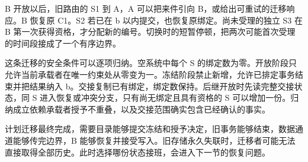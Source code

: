 
B 开放以后，旧路由的 S1 到 A，A 可以把来件引向 B，或给出可重试的迁移响应。B 恢复原 C1。S2 若已在 b 以内提交，也恢复原绑定。尚未受理的独立 S3 在 B 第一次获得资格，才分配新的编号。切换时的短暂停顿，把两次可能首次受理的时间段接成了一个有序边界。

这条迁移的安全条件可以逐项归纳。空系统中每个 S 的绑定数为零。开放阶段只允许当前承载者在唯一约束处从零变为一。冻结阶段禁止新增，允许已排定事务结束并把结果纳入 b。交接复制已有绑定，绑定数保持。后继开放时先读完整交接状态，同 S 进入恢复或冲突分支，只有尚无绑定且具有资格的 S 可以增加一份。归纳成立依赖承载者授予不重叠，以及交接范围确实包含已经确认的事实。

计划迁移最终完成，需要目录能够提交冻结和授予决定，旧事务能够结束，数据通道能够传完边界，B 能够恢复并接受写入。旧存储永久失联时，迁移者可能无法直接取得全部历史。此时选择哪份状态接班，会进入下一节的恢复问题。
\FloatBarrier
